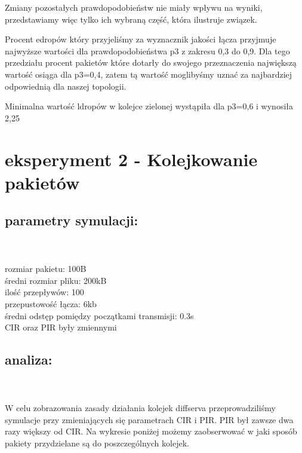 \documentclass[a4paper]{article}
\begin{document}
Zmiany pozostałych prawdopodobieństw nie miały wpływu na wyniki, przedstawiamy więc tylko ich wybraną część, która ilustruje związek.





Procent edropów który przyjeliśmy za wyznacznik jakości łącza przyjmuje najwyższe wartości dla prawdopodobieństwa p3 z zakresu 0,3 do 0,9. Dla tego przedziału procent pakietów które dotarły do swojego przeznaczenia największą wartość osiąga dla p3=0,4, zatem tą wartość moglibyśmy uznać za najbardziej odpowiednią dla naszej topologii. 

Minimalna wartość ldropów w kolejce zielonej wystąpiła dla p3=0,6 i wynosiła 2,25%

\section{eksperyment 2 - Kolejkowanie pakietów}

\subsection{parametry symulacji:}\\
\\
rozmiar pakietu: 100B\\
średni rozmiar pliku: 200kB\\
ilość przepływów: 100\\
przepustowość łącza: 6kb\\
średni odstęp pomiędzy początkami transmisji: 0.3s\\
CIR oraz PIR były zmiennymi\\
\subsection{analiza:}\\
\\
W celu zobrazowania zasady działania kolejek diffserva przeprowadziliśmy symulacje przy zmieniających się parametrach CIR i PIR. PIR był zawsze dwa razy większy od CIR.
Na wykresie poniżej możemy zaobserwować w jaki sposób pakiety przydzielane są do poszczególnych kolejek.\\
\\



\end{document}
